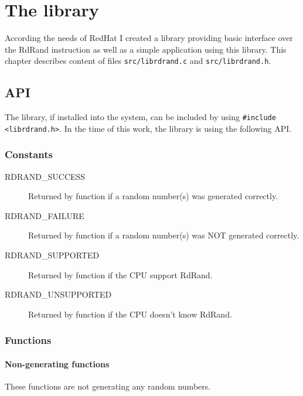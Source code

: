 \chapter{The library}  \label{chap:library}
According the needs of RedHat I created a library providing basic interface over the RdRand instruction as well as a simple application using this library.
This chapter describes content of files {\tt src/librdrand.c} and {\tt src/librdrand.h}.




\section{API} \label{sec:library-api}
The library, if installed into the system, can be included by using {\tt \#include <librdrand.h>}. In the time of this work, the library is using the following API.

\subsection{Constants}
\begin{description}
  \item[RDRAND\_SUCCESS] Returned by function if a random number(s) was generated correctly.
  \item[RDRAND\_FAILURE] Returned by function if a random number(s) was NOT generated correctly.
  \item[RDRAND\_SUPPORTED] Returned by  function if the CPU support RdRand.
  \item[RDRAND\_UNSUPPORTED] Returned by  function if the CPU doesn't know RdRand.
  
\end{description}


\subsection{Functions}

\subsubsection{Non-generating functions}

These functions are not generating any random numbers.\\

